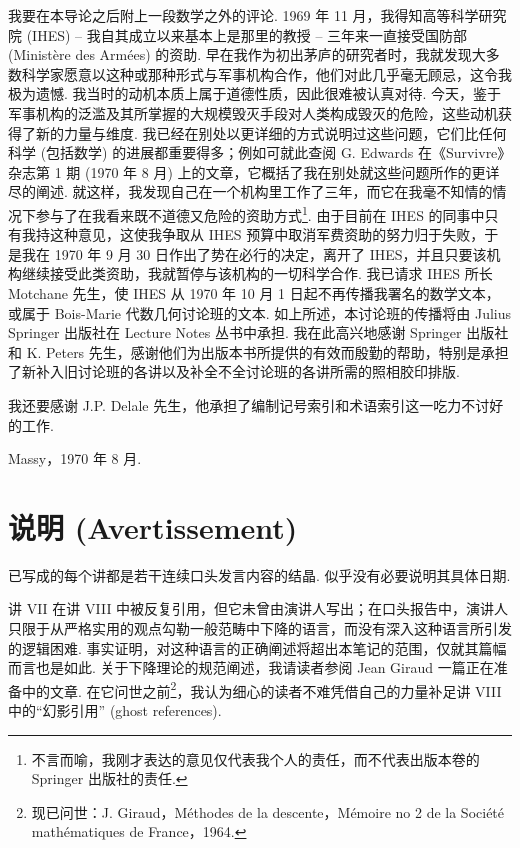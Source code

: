 我要在本导论之后附上一段数学之外的评论. 1969 年 11 月，我得知高等科学研究院 (IHES) -- 我自其成立以来基本上是那里的教授 -- 三年来一直接受国防部 (Ministère des Armées) 的资助. 早在我作为初出茅庐的研究者时，我就发现大多数科学家愿意以这种或那种形式与军事机构合作，他们对此几乎毫无顾忌，这令我极为遗憾. 我当时的动机本质上属于道德性质，因此很难被认真对待. 今天，鉴于军事机构的泛滥及其所掌握的大规模毁灭手段对人类构成毁灭的危险，这些动机获得了新的力量与维度. 我已经在别处以更详细的方式说明过这些问题，它们比任何科学 (包括数学) 的进展都重要得多；例如可就此查阅 G. Edwards 在《Survivre》杂志第 1 期 (1970 年 8 月) 上的文章，它概括了我在别处就这些问题所作的更详尽的阐述. 就这样，我发现自己在一个机构里工作了三年，而它在我毫不知情的情况下参与了在我看来既不道德又危险的资助方式\footnote{不言而喻，我刚才表达的意见仅代表我个人的责任，而不代表出版本卷的 Springer 出版社的责任.}. 由于目前在 IHES 的同事中只有我持这种意见，这使我争取从 IHES 预算中取消军费资助的努力归于失败，于是我在 1970 年 9 月 30 日作出了势在必行的决定，离开了 IHES，并且只要该机构继续接受此类资助，我就暂停与该机构的一切科学合作. 我已请求 IHES 所长 Motchane 先生，使 IHES 从 1970 年 10 月 1 日起不再传播我署名的数学文本，或属于 Bois-Marie 代数几何讨论班的文本. 如上所述，本讨论班的传播将由 Julius Springer 出版社在 Lecture Notes 丛书中承担. 我在此高兴地感谢 Springer 出版社和 K. Peters 先生，感谢他们为出版本书所提供的有效而殷勤的帮助，特别是承担了新补入旧讨论班的各讲以及补全不全讨论班的各讲所需的照相胶印排版.

我还要感谢 J.P. Delale 先生，他承担了编制记号索引和术语索引这一吃力不讨好的工作.

\begin{flushright}
Massy，1970 年 8 月.
\end{flushright}

\cleardoublepage

\chapter*{说明 (Avertissement)}

已写成的每个讲都是若干连续口头发言内容的结晶. 似乎没有必要说明其具体日期.

讲 VII 在讲 VIII 中被反复引用，但它未曾由演讲人写出；在口头报告中，演讲人只限于从严格实用的观点勾勒一般范畴中下降的语言，而没有深入这种语言所引发的逻辑困难. 事实证明，对这种语言的正确阐述将超出本笔记的范围，仅就其篇幅而言也是如此. 关于下降理论的规范阐述，我请读者参阅 Jean Giraud 一篇正在准备中的文章. 在它问世之前\footnote{现已问世：J. Giraud，Méthodes de la descente，Mémoire no 2 de la Société mathématiques de France，1964.}，我认为细心的读者不难凭借自己的力量补足讲 VIII 中的``幻影引用'' (ghost references).

